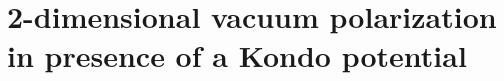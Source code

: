 \chapter{2-dimensional vacuum polarization in presence of a Kondo potential}\label{chap-vacuum}

%



%

